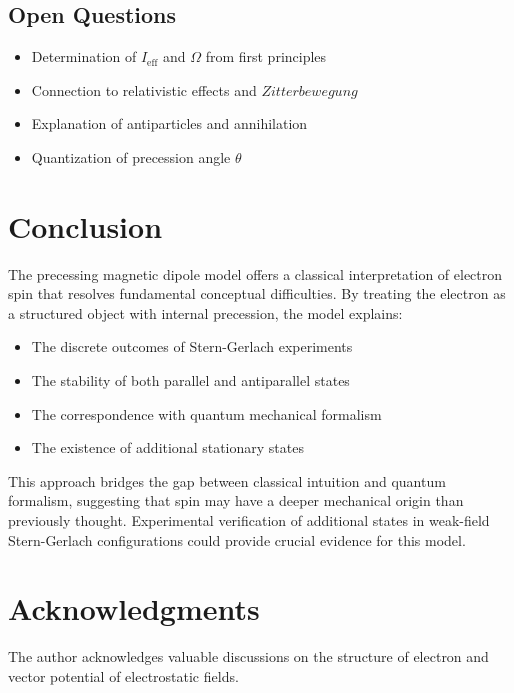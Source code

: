\documentclass[12pt]{article}
\begin{document}
\subsection{Open Questions}

\begin{itemize}
\item Determination of $I_{\text{eff}}$ and $\Omega$ from first principles
\item Connection to relativistic effects and $Zitterbewegung$
\item Explanation of antiparticles and annihilation
\item Quantization of precession angle $\theta$
\end{itemize}

\section{Conclusion}

The precessing magnetic dipole model offers a classical interpretation of electron spin that resolves fundamental conceptual difficulties. By treating the electron as a structured object with internal precession, the model explains:

\begin{itemize}
\item The discrete outcomes of Stern-Gerlach experiments
\item The stability of both parallel and antiparallel states
\item The correspondence with quantum mechanical formalism
\item The existence of additional stationary states
\end{itemize}

This approach bridges the gap between classical intuition and quantum formalism, suggesting that spin may have a deeper mechanical origin than previously thought. Experimental verification of additional states in weak-field Stern-Gerlach configurations could provide crucial evidence for this model.

\section*{Acknowledgments}

The author acknowledges valuable discussions on the structure of electron and vector potential of electrostatic fields.



\end{document}
